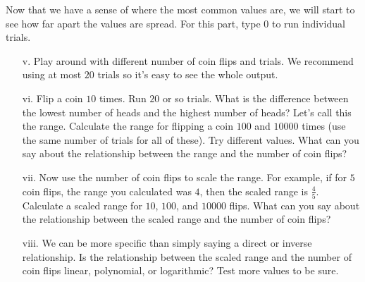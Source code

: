 \documentclass[11pt]{article}
\newif\ifsolutions
\begin{document}
\begin{enumerate}
\begin{enumerate}
\end{enumerate}
Now that we have a sense of where the most common values are, we will start to see how far apart the values are spread. For this part, type $0$ to run individual trials. 
\begin{enumerate}
\item[v.] Play around with different number of coin flips and trials. We recommend using at most $20$ trials so it's easy to see the whole output.

\item[vi.] Flip a coin $10$ times. Run $20$ or so trials. What is the difference between the lowest number of heads and the highest number of heads? Let's call this the range. Calculate the range for flipping a coin $100$ and $10000$ times (use the same number of trials for all of these). Try different values. What can you say about the relationship between the range and the number of coin flips?

\ifsolutions
{\color{blue}{Solution: for 10 coin flips, an example range might be 8-3=5. For 100 coin flips, an example range might be 61-40=21. For 10000 coin flips an example range might be 5088-4894=194. We can see that it increases as we flip more coins, even with the same number of trials.
}}
\fi

\item[vii.] Now use the number of coin flips to scale the range. For example, if for $5$ coin flips, the range you calculated was $4$, then the scaled range is $\frac{4}{5}$. Calculate a scaled range for $10$, $100$, and $10000$ flips. What can you say about the relationship between the scaled range and the number of coin flips?

\ifsolutions
{\color{blue}{Our scaled ranges above would be 0.5, 0.21, 0.0194, which decrease with the number of flips.}}
\fi

\item[viii.] We can be more specific than simply saying a direct or inverse relationship. Is the relationship between the scaled range and the number of coin flips linear, polynomial, or logarithmic? Test more values to be sure.

\ifsolutions
{\color{blue}{Looks logarithmic.}}
\fi


\end{enumerate}
\end{enumerate}
\end{document}
